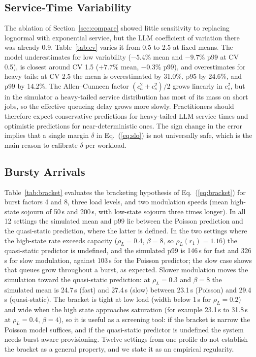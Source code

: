 \documentclass[journal]{IEEEtran}
\begin{document}
\subsection{Service-Time Variability}
The ablation of Section~\ref{sec:compare} showed little sensitivity to replacing lognormal with exponential service, but the LLM coefficient of variation there was already 0.9. Table~\ref{tab:cv} varies it from 0.5 to 2.5 at fixed means. The model underestimates for low variability ($-5.4\%$ mean and $-9.7\%$ p99 at CV 0.5), is closest around CV 1.5 ($+7.7\%$ mean, $-0.3\%$ p99), and overestimates for heavy tails: at CV 2.5 the mean is overestimated by 31.0\%, p95 by 24.6\%, and p99 by 14.2\%. The Allen--Cunneen factor $(c_a^2+c_s^2)/2$ grows linearly in $c_s^2$, but in the simulator a heavy-tailed service distribution has most of its mass on short jobs, so the effective queueing delay grows more slowly. Practitioners should therefore expect conservative predictions for heavy-tailed LLM service times and optimistic predictions for near-deterministic ones. The sign change in the error implies that a single margin $\delta$ in Eq.~(\ref{eq:slo}) is not universally safe, which is the main reason to calibrate $\delta$ per workload.

\subsection{Bursty Arrivals}
Table~\ref{tab:bracket} evaluates the bracketing hypothesis of Eq.~(\ref{eq:bracket}) for burst factors 4 and 8, three load levels, and two modulation speeds (mean high-state sojourn of 50\,s and 200\,s, with low-state sojourn three times longer). In all 12 settings the simulated mean and p99 lie between the Poisson prediction and the quasi-static prediction, where the latter is defined. In the two settings where the high-state rate exceeds capacity ($\rho_L=0.4$, $\beta=8$, so $\rho_L(r_1)=1.16$) the quasi-static predictor is undefined, and the simulated p99 is 146\,s for fast and 326\,s for slow modulation, against 103\,s for the Poisson predictor; the slow case shows that queues grow throughout a burst, as expected. Slower modulation moves the simulation toward the quasi-static prediction: at $\rho_L=0.3$ and $\beta=8$ the simulated mean is 24.7\,s (fast) and 27.4\,s (slow) between 23.1\,s (Poisson) and 29.4\,s (quasi-static). The bracket is tight at low load (width below 1\,s for $\rho_L=0.2$) and wide when the high state approaches saturation (for example 23.1\,s to 31.8\,s at $\rho_L=0.4$, $\beta=4$), so it is useful as a screening tool: if the bracket is narrow the Poisson model suffices, and if the quasi-static predictor is undefined the system needs burst-aware provisioning. Twelve settings from one profile do not establish the bracket as a general property, and we state it as an empirical regularity.
\end{document}
